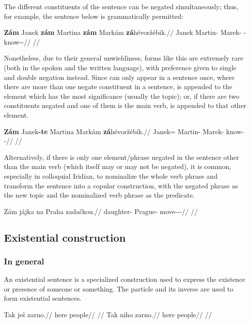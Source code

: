 The different constituents of the sentence can be negated simultaneously; thus,
for example, the sentence below is grammatically permitted:

\pex
\begingl
    \gla \textbf{Zám} Janek \textbf{zám} Martina \textbf{zám} Markám \textbf{zá}hévoržébik.//
    \glb \Neg{} Janek \Neg{} Martin-\Acc{} \Neg{} Marek-\Agt{} \Neg{}-know-\Ben{}-\Pf{}//
    \glft {}//
\endgl
\xe

Nonetheless, due to their general unwieldiness, forms like this are extremely
rare (both in the spoken and the written language), with preference given to
single and double negation instead. Since  can only appear in a
sentence once, where there are more than one negate constituent in a sentence,
 is appended to the element which has the most significance (usually
the topic); or, if there are two constituents negated and one of them is the
main verb,  is appended to that other element.

\pex
\begingl
    \gla \textbf{Zám} Janek\textbf{-te} Martina Markám \textbf{zá}hévoržébik.//
    \glb \Neg{} Janek=\Foc{} Martin-\Acc{} Marek-\Agt{} \Neg{}know-\Ben{}-\Pf{}//
    \glft {}//
\endgl
\xe

Alternatively, if there is only one element/phrase negated in the sentence other than the main verb (which itself may or may not be negated), it is common, especially in colloquial Iridian, to nominalize the whole verb phrase and transform the sentence into a copular construction, with the negated phrase as the new topic and the nominalized verb phrase as the predicate.

\pex
\begingl
    \gla Zám jájka na Praha zadačkou.//
    \glb \Neg{} daughter-\Dim{} \Loc{} Prague-\Acc{} move-\Av{}-\Pf{}-\Nz{}//
    \glft {}//
\endgl
\xe



\subsection{Existential construction}
\label{sec:exst}

\subsubsection{In general}
An existential sentence is a specialized construction used to express the existence or presence of someone or something. The particle  and its inverse  are used to form existential sentences. 
\begin{multicols}{2}
\pex
\a\begingl
\gla Tak ješ zarno.//
\glb here \Exst{} people//
\glft {}//
\endgl
\a\begingl
\gla Tak niho zarno.//
\glb here \N{}\Exst{} people//
\glft {}//
\endgl
\xe
\end{multicols}

